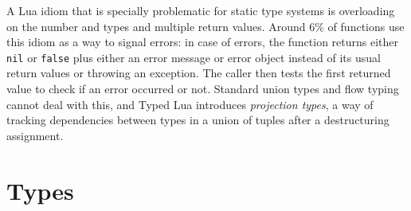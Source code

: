\documentclass[10pt]{sigplanconf}
\begin{document}
A Lua idiom that is specially problematic for static type
systems is overloading on the number and types and
multiple return values. Around 6\% of functions use
this idiom as a way to signal errors: in case of errors,
the function returns either {\tt nil} or {\tt false} plus
either an error message or error object instead of its usual
return values or throwing an exception. The caller then
tests the first returned value to check if an error occurred
or not. Standard union types and flow typing cannot deal
with this, and Typed Lua introduces {\em projection types},
a way of tracking dependencies between types in a union of
tuples after a destructuring assignment.

\section{Types}
\label{sec:types}
\end{document}
